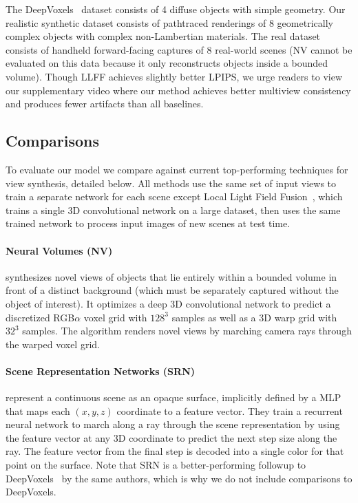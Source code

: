 \documentclass[runningheads]{llncs}
\begin{document}
\begin{table}[t]
{%
The DeepVoxels~\cite{deepvoxels} dataset consists of 4 diffuse objects with simple geometry. Our realistic synthetic dataset consists of pathtraced renderings of 8 geometrically complex objects with complex non-Lambertian materials. The real dataset consists of handheld forward-facing captures of 8 real-world scenes (NV cannot be evaluated on this data because it only reconstructs objects inside a bounded volume). 
Though LLFF achieves slightly better LPIPS, 
we urge readers to view our supplementary video where our method achieves better multiview consistency and produces fewer artifacts than all baselines.
} \vspace{-2mm}

\label{table:results}  
\end{table}
\setlength{\tabcolsep}{1.4pt}



\subsection{Comparisons}

To evaluate our model we compare against current top-performing techniques for view synthesis, detailed below. All methods use the same set of input views to train a separate network for each scene except Local Light Field Fusion~\cite{mildenhall19}, which trains a single 3D convolutional network on a large dataset, then uses the same trained network to process input images of new scenes at test time. 

\paragraph{\textbf{Neural Volumes (NV)}~\cite{neuralvolumes}}
synthesizes novel views of objects that lie entirely within a bounded volume in front of a distinct background (which must be separately captured without the object of interest). It optimizes a deep 3D convolutional network to predict a discretized RGB$\alpha$ voxel grid with $128^3$ samples as well as a 3D warp grid with $32^3$ samples. The algorithm renders novel views by marching camera rays through the warped voxel grid. 

\paragraph{\textbf{Scene Representation Networks (SRN)}~\cite{srn}}
represent a continuous scene as an opaque surface, implicitly defined by a MLP that maps each $(x,y,z)$ coordinate to a feature vector. They train a recurrent neural network to march along a ray through the scene representation by using the feature vector at any 3D coordinate to predict the next step size along the ray. The feature vector from the final step is decoded into a single color for that point on the surface. Note that SRN is a better-performing followup to DeepVoxels~\cite{deepvoxels} by the same authors, which is why we do not include comparisons to DeepVoxels.
\end{document}
